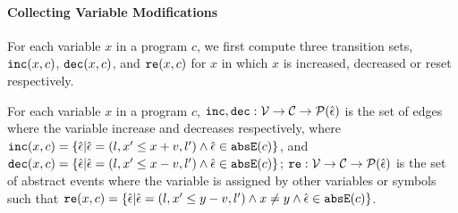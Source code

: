 \paragraph{Collecting Variable Modifications}
 For each variable $x$ in a program $c$, we first compute three transition sets, $\mathtt{inc}(x, c)$, $\mathtt{dec}(x, c)$,
 and $\mathtt{re}(x, c)$ for $x$
 in which $x$ is increased,
 decreased
 or reset
 respectively.
 \begin{defn}
 \label{def:var_modi}
 For each variable $x$ in a program $c$,
 $\mathtt{inc}, \mathtt{dec} : \mathcal{V} \to \mathcal{C} \to \mathcal{P}(\hat{\mathtt{\epsilon}{}}) $
 is the set of edges where the variable increase and decreases respectively, 
 where $\inc(x, c) = \left\{ \absevent | \absevent = (l, x' \leq x + v, l') \land \absevent \in \absE(c) \right\}$,
 and $\dec(x, c) = \left\{\absevent| \absevent = (l, x' \leq x - v, l') \land \absevent \in \absE(c) \right\}$;
 $\mathtt{re}: \mathcal{V} \to \mathcal{C} \to \mathcal{P}(\hat{\mathtt{\epsilon}{}}) $ is the set of abstract events where the variable is assigned by other variables or symbols such that
 $\reset(x, c) = \left\{ \absevent| \absevent = (l, x' \leq y - v, l') \land x \neq y \land \absevent \in \absE(c) \right\}$. 
 \end{defn}
